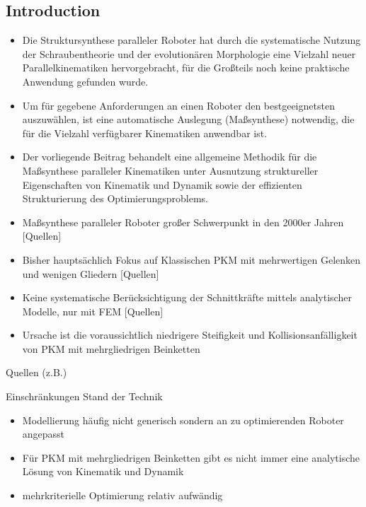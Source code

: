\documentclass[fleqn,a4paper,10pt]{article}
\begin{document}
\vspace{18pt} %


\begin{multicols}{2}

\section{Introduction}

\begin{itemize}
\item Die Struktursynthese paralleler Roboter hat durch die systematische Nutzung der Schraubentheorie \cite{KongGos2007} und der evolutionären Morphologie \cite{Gogu2008} eine Vielzahl neuer Parallelkinematiken hervorgebracht, für die Großteils noch keine praktische Anwendung gefunden wurde.
\item Um für gegebene Anforderungen an einen Roboter den bestgeeignetsten auszuwählen, ist eine automatische Auslegung (Maßsynthese) notwendig, die für die Vielzahl verfügbarer Kinematiken anwendbar ist.
\item Der vorliegende Beitrag behandelt eine allgemeine Methodik für die Maßsynthese paralleler Kinematiken unter Ausnutzung struktureller Eigenschaften von Kinematik und Dynamik sowie der effizienten Strukturierung des Optimierungsproblems.
\item Maßsynthese paralleler Roboter großer Schwerpunkt in den 2000er Jahren [Quellen]
\item Bisher hauptsächlich Fokus auf Klassischen PKM mit mehrwertigen Gelenken und wenigen Gliedern [Quellen]
\item Keine systematische Berücksichtigung der Schnittkräfte mittels analytischer Modelle, nur mit FEM [Quellen]
\item Ursache ist die voraussichtlich niedrigere Steifigkeit und Kollisionsanfälligkeit von PKM mit mehrgliedrigen Beinketten
\end{itemize}

Quellen (z.B.)
\cite{JamwalHusXie2015}
\cite{Krefft2006}
\cite{CarboneOttCec2007}
\cite{ZhouBaiHan2011}

Einschränkungen Stand der Technik
\begin{itemize}
\item Modellierung häufig nicht generisch sondern an zu optimierenden Roboter angepasst
\item Für PKM mit mehrgliedrigen Beinketten gibt es nicht immer eine analytische Lösung von Kinematik und Dynamik
\item mehrkriterielle Optimierung relativ aufwändig
\end{itemize}


\end{multicols}
\end{document}

